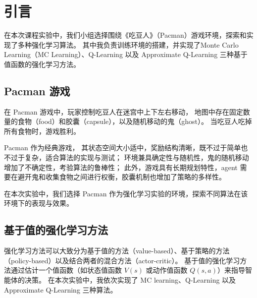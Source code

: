 \section{引言}

在本次课程实验中，我们小组选择围绕《吃豆人》（Pacman）游戏环境，探索和实现了多种强化学习算法。
其中我负责训练环境的搭建，并实现了Monte Carlo Learning（MC Learning）、Q-Learning 以及 Approximate Q-Learning 三种基于值函数的强化学习方法。

\subsection{Pacman 游戏}
在 Pacman 游戏中，玩家控制吃豆人在迷宫中上下左右移动，
地图中存在固定数量的食物（food）和胶囊（capsule），以及随机移动的鬼（ghost）。
当吃豆人吃掉所有食物时，游戏胜利。



 Pacman 作为经典游戏，%
其状态空间大小适中，奖励结构清晰，既不过于简单也不过于复杂，适合算法的实现与测试；
环境兼具确定性与随机性，鬼的随机移动增加了不确定性，考验算法的鲁棒性；
此外，游戏具有长期规划特性，agent 需要在避开鬼和收集食物之间进行权衡，胶囊机制也增加了策略的多样性。

在本次实验中，我们选择 Pacman 作为强化学习实验的环境，探索不同算法在该环境下的表现与效果。


\subsection{基于值的强化学习方法}

强化学习方法可以大致分为基于值的方法（value-based）、基于策略的方法（policy-based）以及结合两者的混合方法（actor-critic）。
基于值的强化学习方法通过估计一个值函数（如状态值函数 $V(s)$ 或动作值函数 $Q(s,a)$）来指导智能体的决策。
在本次实验中，我依次实现了 MC learning、Q-Learning 以及 Approximate Q-Learning 三种算法。

